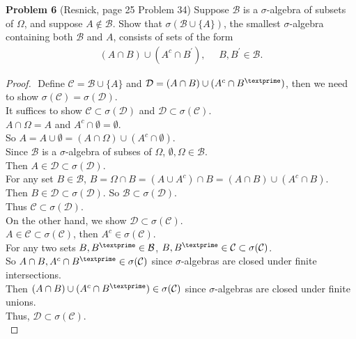 \documentclass{article}
\newcommand{\lld}{\mathcal{D}}
\newcommand{\llc}{\mathcal{C}}
\newcommand{\llb}{\mathcal{B}}
\begin{document}
 \setcounter{page}{8}
\vspace{3 mm}

\noindent \textbf{Problem 6} (Resnick, page 25 Problem 34) Suppose $\mathcal{B}$ is a $\sigma$-algebra of subsets of $\Omega$, and suppose $A \notin \mathcal{B}$.  Show that $\sigma(\mathcal{B} \cup \{A\})$, the smallest $\sigma$-algebra containing both $\mathcal{B}$ and $A$, consists of sets of the form
\begin{eqnarray*} (A \cap B) \cup (A^{c} \cap B^{'}), ~~~~~~ B, B^{'} \in \mathcal{B}. \end{eqnarray*}

\begin{proof}
	$ $\newline
	Define $\llc = \llb \cup \{A\}$ and $\lld = {(A \cap B) \cup (A^c \cap B^\textprime)}$, then we need to show $\sigma(\llc) = \sigma(\lld)$. \\
	It suffices to show $\llc \subset \sigma(\lld)$ and $\lld \subset \sigma(\llc)$.\\
	$A \cap \Omega = A$ and $A^c \cap \emptyset = \emptyset$.\\
	So $A = A \cup \emptyset = (A \cap \Omega) \cup  (A^c \cap \emptyset)$.\\
	Since $\llb$ is a $\sigma$-algebra of subses of $\Omega$, $\emptyset, \Omega \in \llb$.\\
	Then $A \in \lld \subset \sigma(\lld)$.\\
	For any set $B \in \llb$, $B = \Omega \cap B  = (A \cup A^c) \cap B = (A \cap B) \cup (A^c \cap B)$.\\
	Then $B \in \lld \subset \sigma(\lld)$. So $\llb \subset \sigma(\lld)$.\\
	Thus $\llc \subset \sigma(\lld)$.\\
	On the other hand, we show $\lld \subset \sigma(\llc)$. \\
	$A \in \llc \subset \sigma(\llc)$, then $A^c \in \sigma(\llc)$.\\
	For any two sets $B,B^\textprime \in \llb$, $B, B^\textprime \in \llc \subset \sigma(\llc)$.\\
	So $A\cap B, A^c\cap B^\textprime \in \sigma(\llc)$ since $\sigma$-algebras are closed under finite intersections.\\
	Then $(A\cap B) \cup (A^c \cap B^\textprime) \in \sigma(\llc)$ since $\sigma$-algebras are closed under finite unions.\\
	Thus, $\lld \subset \sigma(\llc)$.\\



\end{proof}
\end{document}
